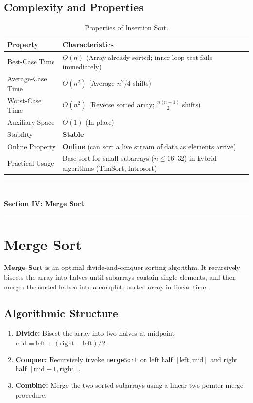 \subsection{Complexity and Properties}

\begin{table}[htbp]
\centering
\small
\begin{tabularx}{\textwidth}{l X}
\toprule
\textbf{Property} & \textbf{Characteristics} \\
\midrule
Best-Case Time    & $\boxed{O(n)}$ (Array already sorted; inner loop test fails immediately) \\
Average-Case Time & $\boxed{O(n^2)}$ (Average $n^2/4$ shifts) \\
Worst-Case Time   & $\boxed{O(n^2)}$ (Reverse sorted array; $\frac{n(n-1)}{2}$ shifts) \\
Auxiliary Space   & $\boxed{O(1)}$ (In-place) \\
Stability         & \textbf{Stable} \\
Online Property   & \textbf{Online} (can sort a live stream of data as elements arrive) \\
Practical Usage   & Base sort for small subarrays ($n \leq 16$--$32$) in hybrid algorithms (TimSort, Introsort) \\
\bottomrule
\end{tabularx}
\caption{Properties of Insertion Sort.}
\end{table}

\newpage
\begin{center}
\vspace{0.5em}
{\color{primary}\rule{0.45\textwidth}{1.2pt}}\\[4pt]
{\Large\bfseries\color{primary} Section IV: Merge Sort}\\[2pt]
{\color{primary}\rule{0.45\textwidth}{1.2pt}}
\vspace{0.5em}
\end{center}

\section{Merge Sort}

\textbf{Merge Sort} is an optimal divide-and-conquer sorting algorithm. It recursively bisects the array into halves until subarrays contain single elements, and then merges the sorted halves into a complete sorted array in linear time.

\subsection{Algorithmic Structure}
\begin{enumerate}
    \item \textbf{Divide:} Bisect the array into two halves at midpoint $\text{mid} = \text{left} + (\text{right} - \text{left})/2$.
    \item \textbf{Conquer:} Recursively invoke \texttt{mergeSort} on left half $[\text{left}, \text{mid}]$ and right half $[\text{mid}+1, \text{right}]$.
    \item \textbf{Combine:} Merge the two sorted subarrays using a linear two-pointer merge procedure.
\end{enumerate}

